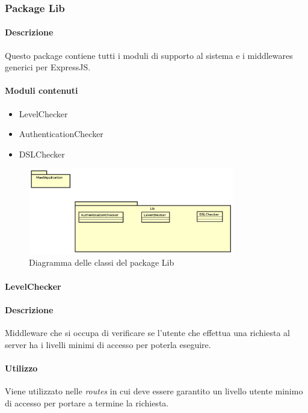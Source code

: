 \subsubsection{Package Lib}
\paragraph*{Descrizione}
Questo package contiene tutti i moduli di supporto al sistema e i middlewares generici per ExpressJS.

\paragraph*{Moduli contenuti}
\begin{itemize}
\item LevelChecker
\item AuthenticationChecker
\item DSLChecker
\end{itemize}


\begin{figure}[H]
\centering
\includegraphics[width=0.8\textwidth]{res/sections/backend/lib.png}
\caption{Diagramma delle classi del package Lib}
\end{figure}

\paragraph{LevelChecker}
\paragraph*{Descrizione}
Middleware che si occupa di verificare se l'utente che effettua una richiesta al server ha i livelli minimi di accesso per poterla eseguire.

\paragraph*{Utilizzo}
Viene utilizzato nelle \textit{routes} in cui deve essere garantito un livello utente minimo di accesso per portare a termine la richiesta.

